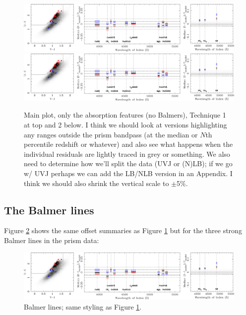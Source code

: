 \documentclass[a4paper,fleqn,usenatbib]{mnras}
\newcommand{\bfb}{\color{myblue}}
\begin{document}
\begin{figure}
\includegraphics[width = \textwidth]{residuals}
\includegraphics[width = \textwidth]{residuals}
\caption{\bfb Main plot, only the absorption features (no Balmers), Technique 1 at top and 2 below.
		I think we should look at versions highlighting any ranges outside the prism bandpass 
		(at the median or $N$th percentile redshift or whatever) and also see what happens when
		the individual residuals are lightly traced in grey or something. We also need to determine
		how we'll split the data (UVJ or (N)LB); if we go w/ UVJ perhaps we can add the LB/NLB
		version in an Appendix. I think we should also shrink the vertical scale to $\pm$5\%.}
\label{fig:resids}
\end{figure}

\subsection{The Balmer lines}

Figure \ref{fig:balmer} shows the same offset summaries as Figure \ref{fig:resids} but for the three
strong Balmer lines in the prism data: 

\begin{figure}
\includegraphics[width = \linewidth]{residuals}
\caption{Balmer lines; same styling as Figure \ref{fig:resids}.}
\label{fig:balmer}
\end{figure}
\end{document}
